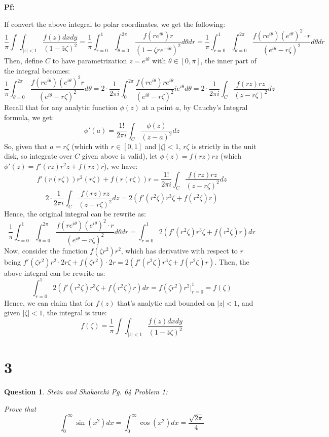 \documentclass{article}
\newtheorem{question}{Question}
\begin{document}
\textbf{Pf:}

If convert the above integral to polar coordinates, we get the following:
$$\frac{1}{\pi}\int\int_{|z|<1}\frac{f(z)dxdy}{(1-\bar{z}\zeta)^2}=\frac{1}{\pi}\int_{r=0}^{1}\int_{\theta=0}^{2\pi}\frac{f(re^{i\theta})r}{(1-\zeta re^{-i\theta})^2}d\theta dr = \frac{1}{\pi}\int_{r=0}^{1}\int_{\theta=0}^{2\pi}\frac{f(re^{i\theta})(e^{i\theta})^2\cdot r}{(e^{i\theta}-r\zeta)^2}d\theta dr$$
Then, define $C$ to have parametrization $z=e^{i\theta}$ with $\theta\in [0,\pi]$, the inner part of the integral becomes:
$$\frac{1}{\pi}\int_{\theta=0}^{2\pi}\frac{f(re^{i\theta})(e^{i\theta})^2r}{(e^{i\theta}-r\zeta)^2}d\theta =2\cdot \frac{1}{2\pi i}\int_{0}^{2\pi}\frac{f(re^{i\theta})re^{i\theta}}{(e^{i\theta}-r\zeta)^2}ie^{i\theta}d\theta = 2\cdot\frac{1}{2\pi i}\int_{C}\frac{f(rz)rz}{(z-r\zeta)^2}dz$$
Recall that for any analytic function $\phi(z)$ at a point $a$, by Cauchy's Integral formula, we get:
$$\phi'(a)=\frac{1!}{2\pi i}\int_{C}\frac{\phi(z)}{(z-a)^2}dz$$
So, given that $a=r\zeta$ (which with $r\in [0,1]$ and $|\zeta|<1$, $r\zeta$ is strictly in the unit disk, so integrate over $C$ given above is valid), let $\phi(z)=f(rz)rz$ (which $\phi'(z)=f'(rz)r^2z + f(rz)r$), we have:
$$f'(r(r\zeta))r^2(r\zeta) + f(r(r\zeta))r = \frac{1!}{2\pi i}\int_{C}\frac{f(rz)rz}{(z-r\zeta)^2}dz$$
$$2\cdot\frac{1}{2\pi i}\int_{C}\frac{f(rz)rz}{(z-r\zeta)^2}dz = 2\left(f'(r^2\zeta)r^3\zeta + f(r^2\zeta)r\right)$$
Hence, the original integral can be rewrite as:
$$\frac{1}{\pi}\int_{r=0}^{1}\int_{\theta=0}^{2\pi}\frac{f(re^{i\theta})(e^{i\theta})^2\cdot r}{(e^{i\theta}-r\zeta)^2}d\theta dr = \int_{r=0}^{1}2\left(f'(r^2\zeta)r^3\zeta + f(r^2\zeta)r\right) dr$$
Now, consider the function $f(\zeta r^2)r^2$, which has derivative with respect to $r$ being $f'(\zeta r^2)r^2\cdot 2r\zeta + f(\zeta r^2)\cdot 2r = 2\left(f'(r^2\zeta)r^3\zeta + f(r^2\zeta)r\right)$. 
Then, the above integral can be rewrite as:
$$\int_{r=0}^{1}2\left(f'(r^2\zeta)r^3\zeta + f(r^2\zeta)r\right) dr = f(\zeta r^2)r^2\bigg|_{r=0}^{1} = f(\zeta)$$
Hence, we can claim that for $f(z)$ that's analytic and bounded on $|z|<1$, and given $|\zeta|<1$, the integral is true:
$$f(\zeta)=\frac{1}{\pi}\int\int_{|z|<1}\frac{f(z)dxdy}{(1-\bar{z}\zeta)^2}$$

\break

\section*{3}
\begin{myBox}[]{}
    \begin{question}
        Stein and Shakarchi Pg. 64 Problem 1:

        Prove that
        $$\int_{0}^{\infty}\sin(x^2)dx = \int_{0}^{\infty}\cos(x^2)dx = \frac{\sqrt{2\pi}}{4}$$
    \end{question}
\end{myBox}
\end{document}
